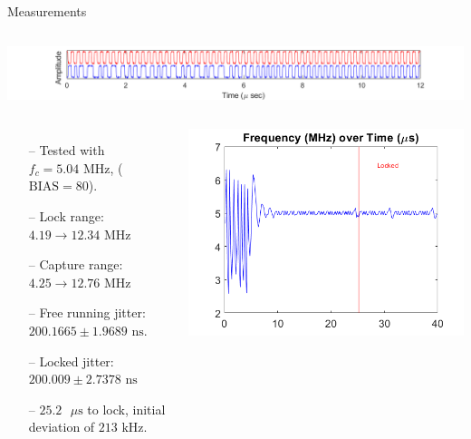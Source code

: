 \documentclass{beamer}
\begin{document}
\begin{frame}{Measurements}
	\begin{columns}
	\vspace*{-5mm}
	\begin{flushleft}
		\includegraphics[scale=0.4125]{../impl_waveform}
	\end{flushleft}
	\end{columns}
   	\begin{columns}
    	\column{0.5\linewidth}
    	\begin{itemize}
            \item[--]
                Tested with $f_c=5.04\textrm{ MHz}$, ($\textrm{BIAS}=80$).
    		\item[--]
	    		Lock range: $4.19\rightarrow12.34\textrm{ MHz}$ 
            \item[--]
                Capture range: $4.25\rightarrow12.76\textrm{ MHz}$
            \item[--]
                Free running jitter: $200.1665\pm1.9689\textrm{ ns}$.
            \item[--]
                Locked jitter: $200.009\pm2.7378\textrm{ ns}$
            \item[--]
                $25.2\textrm{ }\mu\textrm{s}$ to lock, initial deviation of $213\textrm{ kHz}$. 
        \end{itemize}
    	
    	\includegraphics[scale=0.45]{../impl_locking}
    \end{columns}
\end{frame}
\end{document}
